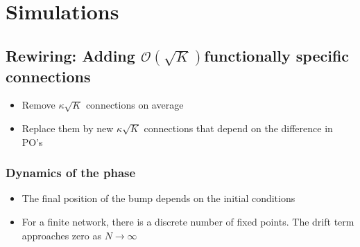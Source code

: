 \section{Simulations}

\subsection{Rewiring: Adding $\mathcal{O} (\sqrt{K})$functionally specific connections}

\begin{itemize}
	\item Remove $\kappa \sqrt{K}$ connections on average
	\item Replace them by new $\kappa \sqrt{K}$ connections that depend on the difference in PO's
\end{itemize}

\subsubsection{Dynamics of the phase}
\begin{itemize}
  \item The final position of the bump depends on the initial conditions
  \item For a finite network, there is a discrete number of fixed points. The drift term approaches zero as $N \rightarrow \infty$
\end{itemize}


